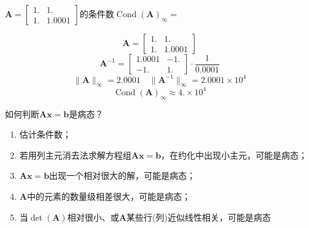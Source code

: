 \begin{example}
    $\boldsymbol{A}=\begin{bmatrix}1.&1.\\1.&1.0001\end{bmatrix}$的条件数$\operatorname{Cond}(\boldsymbol{A})_{\infty}=$
    \begin{solution}
        \[
            \boldsymbol{A}=\begin{bmatrix}1.&1.\\1.&1.0001\end{bmatrix}
        \]
        \[
            \boldsymbol{A}^{-1}=\begin{bmatrix}1.0001&-1.\\-1.&1.\end{bmatrix}\cdotp\frac1{0.0001}
        \]
        \[
            \| \boldsymbol{A}\|_\infty=2.0001\quad\| \boldsymbol{A}^{-1}\|_\infty=2.0001\times10^4
        \]
        \[
            \operatorname{Cond}(\boldsymbol{A})_\infty\approx4.\times10^4
        \]
    \end{solution}
\end{example}
\begin{note}
    如何判断$\boldsymbol{Ax} = \boldsymbol{b}$是病态？
    \begin{enumerate}
        \item 估计条件数；
        \item 若用列主元消去法求解方程组$\boldsymbol{Ax} = \boldsymbol{b}$，在约化中出现小主元，可能是病态；
        \item $\boldsymbol{Ax} = \boldsymbol{b}$出现一个相对很大的解，可能是病态；
        \item $\boldsymbol{A}$中的元素的数量级相差很大，可能是病态；
        \item 当$\det(\boldsymbol{A})$相对很小、或$\boldsymbol{A}$某些行(列)近似线性相关，可能是病态
    \end{enumerate}
\end{note}